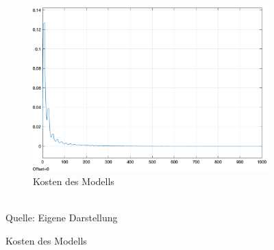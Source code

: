 \begin{figure}[h]
\begin{subfigure}[b]{0.3\textwidth}
    \includegraphics[width=\textwidth]{abbildungen/c_ep_approx_convergence_kosten.png}
    \caption{Kosten des Modells}
  \end{subfigure}
  \\
  Quelle: Eigene Darstellung
\end{figure}
